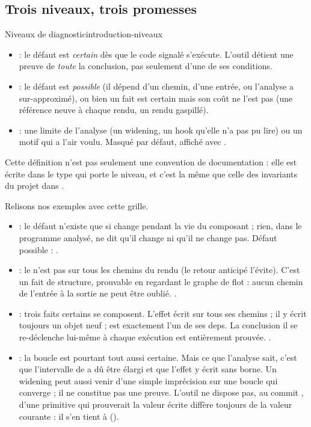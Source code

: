 \subsection{Trois niveaux, trois promesses}

\begin{definition}{Niveaux de diagnostic}{introduction-niveaux}
  \begin{itemize}
    \item \Error{} : le défaut est \emph{certain} dès que le code signalé
      s'exécute. L'outil détient une preuve de \emph{toute} la conclusion,
      pas seulement d'une de ses conditions.
    \item \Warning{} : le défaut est \emph{possible} (il dépend d'un chemin,
      d'une entrée, ou l'analyse a sur-approximé), ou bien un fait est certain
      mais son coût ne l'est pas (une référence neuve à chaque rendu, un rendu
      gaspillé).
    \item \Info{} : une limite de l'analyse (un widening, un hook qu'elle n'a
      pas pu lire) ou un motif qui a l'air voulu. Masqué par défaut, affiché
      avec .
  \end{itemize}
\end{definition}

Cette définition n'est pas seulement une convention de documentation : elle
est écrite dans le type qui porte le niveau, et c'est la même que celle des
invariants du projet dans .


Relisons nos exemples avec cette grille.
\begin{itemize}
  \item {} : le défaut n'existe que si  change
    pendant la vie du composant ; rien, dans le programme analysé, ne dit
    qu'il change ni qu'il ne change pas. Défaut possible : \Warning.
  \item {} : le  n'est pas sur tous les chemins du
    rendu (le retour anticipé l'évite). C'est un fait de structure, prouvable
    en regardant le graphe de flot : aucun chemin de l'entrée à la sortie ne
    peut être oublié. \Error.
  \item {} : trois faits certains se composent. L'effet écrit
     sur tous ses chemins ; il y écrit toujours un objet neuf ;
     est exactement l'un de ses deps. La conclusion \og il se
    re-déclenche lui-même à chaque exécution\fg{} est entièrement prouvée.
    \Error.
  \item {} : la boucle est pourtant tout aussi certaine. Mais ce
    que l'analyse sait, c'est que l'intervalle de  a dû être élargi et
    que l'effet y écrit sans borne. Un widening peut aussi venir d'une simple
    imprécision sur une boucle qui converge ; il ne constitue pas une preuve.
    L'outil ne dispose pas, au commit \snapshotCommit{}, d'une primitive qui
    prouverait \og la valeur écrite diffère toujours de la valeur
    courante\fg{} : il s'en tient à \Warning{} ().
\end{itemize}

